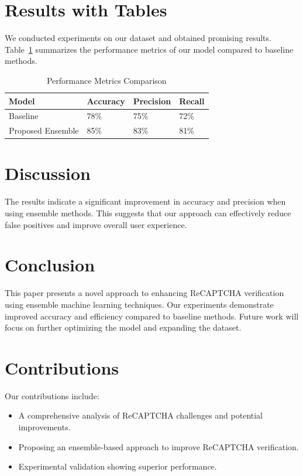 \documentclass{article}
\begin{document}
\section{Results with Tables}
We conducted experiments on our dataset and obtained promising results. Table~\ref{table:results} summarizes the performance metrics of our model compared to baseline methods.

\begin{table}[ht]
\centering
\caption{Performance Metrics Comparison}
\label{table:results}
\begin{tabular}{@{}llll@{}}
\toprule
Model & Accuracy & Precision & Recall \\ \midrule
Baseline & 78\% & 75\% & 72\% \\
Proposed Ensemble & 85\% & 83\% & 81\% \\ \bottomrule
\end{tabular}
\end{table}

\section{Discussion}
The results indicate a significant improvement in accuracy and precision when using ensemble methods. This suggests that our approach can effectively reduce false positives and improve overall user experience.

\section{Conclusion}
This paper presents a novel approach to enhancing ReCAPTCHA verification using ensemble machine learning techniques. Our experiments demonstrate improved accuracy and efficiency compared to baseline methods. Future work will focus on further optimizing the model and expanding the dataset.

\section{Contributions}
Our contributions include:
\begin{itemize}
    \item A comprehensive analysis of ReCAPTCHA challenges and potential improvements.
    \item Proposing an ensemble-based approach to improve ReCAPTCHA verification.
    \item Experimental validation showing superior performance.
\end{itemize}



\end{document}
